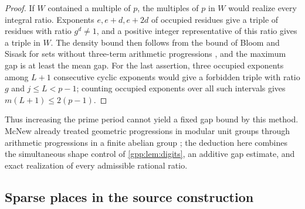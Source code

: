 \begin{proof}
If $W$ contained a multiple of $p$, the multiples of $p$ in $W$ would realize every
integral ratio. Exponents $e,e+d,e+2d$ of occupied residues give a triple of residues
with ratio $g^d\ne1$, and a positive integer representative of this ratio gives a triple
in $W$. The density bound then follows from the bound of Bloom and Sisask for sets
without three-term arithmetic progressions \cite{Bloom2023Improvement}, and the maximum
gap is at least the mean gap. For the last assertion, three occupied exponents among
$L+1$ consecutive cyclic exponents would give a forbidden triple with ratio $g$ and
$j\le L<p-1$; counting occupied exponents over all such intervals gives
$m(L+1)\le2(p-1)$.
\end{proof}

Thus increasing the prime period cannot yield a fixed gap bound by this method. McNew
already treated geometric progressions in modular unit groups through arithmetic
progressions in a finite abelian group \cite[Section~2]{McNew2015Sets}; the deduction
here combines the simultaneous shape control of \cref{gpp:lem:digits}, an additive gap
estimate, and exact realization of every admissible rational ratio.


\subsection{Sparse places in the source construction}\label{gpp:sec:sparse}
{\raggedright{}}

